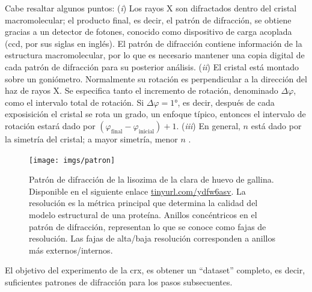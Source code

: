 Cabe resaltar algunos puntos: (\emph{i}) Los rayos X son difractados dentro del cristal macromolecular; el producto final, es decir, el patrón de difracción, se obtiene gracias a un detector de fotones, conocido como dispositivo de carga acoplada (\acrshort{ccd}, por sus siglas en inglés). El patrón de difracción contiene información de la estructura macromolecular, por lo que es necesario mantener una copia digital de cada patrón de difracción para su posterior análisis. (\emph{ii}) El cristal está montado sobre un goniómetro. Normalmente su rotación es perpendicular a la dirección del haz de rayos X. Se especifica tanto el incremento de rotación, denominado $\Delta\varphi$, como el intervalo total de rotación. Si $\Delta\varphi=1\si{\degree}$, es decir, después de cada exposisición el cristal se rota un grado, un enfoque típico, entonces el intervalo de rotación estará dado por $\left(\varphi_{\mathrm{final}}-\varphi_{\mathrm{inicial}}\right) + 1$. (\emph{iii}) En general, $n$ está dado por la simetría del cristal; a mayor simetría, menor $n$ . %

\begin{figure}[hb]
	\texttt{[image: imgs/patron]}
	\caption[Patrón de difracción]{Patrón de difracción de la lisozima de la clara de huevo de gallina. Disponible en el siguiente enlace \url{tinyurl.com/ydfw6asv}. La resolución es la métrica principal que determina la calidad del modelo estructural de una proteína. Anillos concéntricos en el patrón de difracción, representan lo que se conoce como fajas de resolución. Las fajas de alta/baja resolución corresponden a anillos más externos/internos.}
\end{figure}

El objetivo del experimento de la \acrshort{crx}, es obtener un \enquote{dataset} completo, es decir, suficientes patrones de difracción para los pasos subsecuentes.

